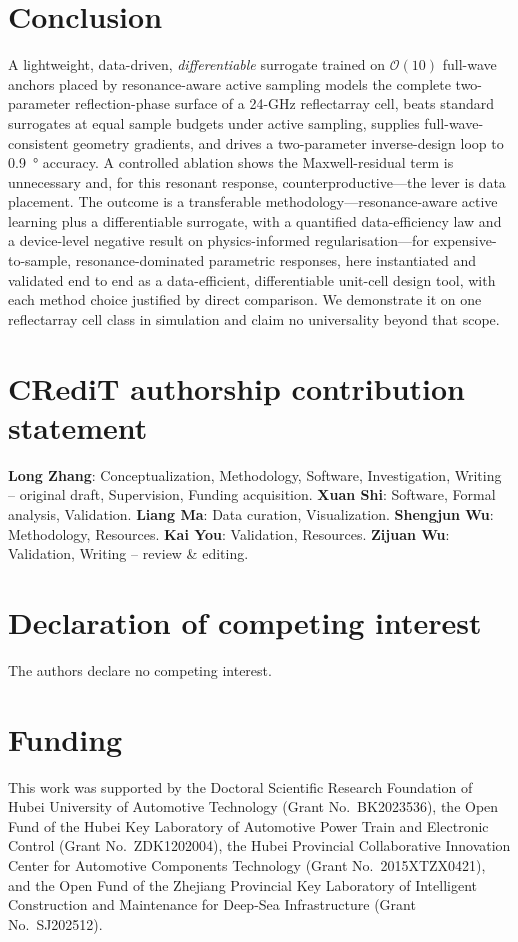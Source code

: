 \documentclass[11pt]{article}
\begin{document}
\section{Conclusion}
A lightweight, data-driven, \emph{differentiable} surrogate trained on $\mathcal{O}(10)$ full-wave
anchors placed by resonance-aware active sampling models the complete two-parameter reflection-phase
surface of a 24-GHz reflectarray cell, beats standard surrogates at equal sample budgets under active
sampling, supplies full-wave-consistent geometry gradients, and drives a two-parameter inverse-design
loop to \SI{0.9}{\degree} accuracy. A controlled ablation shows the Maxwell-residual term is unnecessary
and, for this resonant response, counterproductive---the lever is data placement. The outcome is a
transferable methodology---resonance-aware active learning plus a differentiable surrogate, with a
quantified data-efficiency law and a device-level negative result on physics-informed regularisation---for
expensive-to-sample, resonance-dominated parametric responses, here instantiated and validated end to end
as a data-efficient, differentiable unit-cell design tool, with each method choice justified by direct
comparison. We demonstrate it on one reflectarray cell class in simulation and claim no universality
beyond that scope.

\section*{CRediT authorship contribution statement}
\textbf{Long Zhang}: Conceptualization, Methodology, Software, Investigation, Writing -- original draft,
Supervision, Funding acquisition.
\textbf{Xuan Shi}: Software, Formal analysis, Validation.
\textbf{Liang Ma}: Data curation, Visualization.
\textbf{Shengjun Wu}: Methodology, Resources.
\textbf{Kai You}: Validation, Resources.
\textbf{Zijuan Wu}: Validation, Writing -- review \& editing.

\section*{Declaration of competing interest}
The authors declare no competing interest.

\section*{Funding}
This work was supported by the Doctoral Scientific Research Foundation of Hubei University of Automotive
Technology (Grant No.\ BK2023536), the Open Fund of the Hubei Key Laboratory of Automotive Power Train and
Electronic Control (Grant No.\ ZDK1202004), the Hubei Provincial Collaborative Innovation Center for
Automotive Components Technology (Grant No.\ 2015XTZX0421), and the Open Fund of the Zhejiang Provincial Key
Laboratory of Intelligent Construction and Maintenance for Deep-Sea Infrastructure (Grant No.\ SJ202512).
\end{document}
